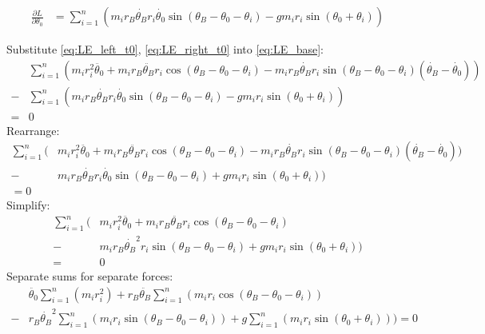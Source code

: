\documentclass[titlepage]{article}
\numberwithin{equation}{section}
\begin{document}
\begin{align}
\frac{\partial L}{\partial \theta_0} &=
    \sum_{i=1}^{n}(
        m_i r_B \dot{\theta_B} r_i \dot{\theta_0} \sin{(\theta_B - \theta_0 - \theta_i)}
      - g m_i r_i \sin{(\theta_0 + \theta_i)}
    ) \label{eq:LE_right_t0}
\end{align}

\bigskip
\noindent
Substitute \ref{eq:LE_left_t0}, \ref{eq:LE_right_t0} into \ref{eq:LE_base}:
\begin{align}
&\sum_{i=1}^{n}(
    m_i r_i^2 \ddot{\theta_0}
  + m_i r_B \ddot{\theta_B} r_i \cos{(\theta_B - \theta_0 - \theta_i)}
  - m_i r_B \dot{\theta_B} r_i \sin{(\theta_B - \theta_0 - \theta_i)} (\dot{\theta_B} - \dot{\theta_0})
) \nonumber \\
- &\sum_{i=1}^{n}(
    m_i r_B \dot{\theta_B} r_i \dot{\theta_0} \sin{(\theta_B - \theta_0 - \theta_i)}
  - g m_i r_i \sin{(\theta_0 + \theta_i)}
) \nonumber \\
= &0
\end{align}
Rearrange:
\begin{align}
\sum_{i=1}^{n}(
    &m_i r_i^2 \ddot{\theta_0}
  + m_i r_B \ddot{\theta_B} r_i \cos{(\theta_B - \theta_0 - \theta_i)}
  - m_i r_B \dot{\theta_B} r_i \sin{(\theta_B - \theta_0 - \theta_i)} (\dot{\theta_B} - \dot{\theta_0})) \nonumber \\
  - &m_i r_B \dot{\theta_B} r_i \dot{\theta_0} \sin{(\theta_B - \theta_0 - \theta_i)}
  + g m_i r_i \sin{(\theta_0 + \theta_i)}
) \nonumber \\
= 0
\end{align}
Simplify:
\begin{align}
\sum_{i=1}^{n}(
    &m_i r_i^2 \ddot{\theta_0} + m_i r_B \ddot{\theta_B} r_i \cos{(\theta_B - \theta_0 - \theta_i)} \nonumber \\
  - &m_i r_B \dot{\theta_B}^2 r_i \sin{(\theta_B - \theta_0 - \theta_i)}
  + g m_i r_i \sin{(\theta_0 + \theta_i)}
) \nonumber \\
= &0
\end{align}
Separate sums for separate forces:
\begin{align}
  &\ddot{\theta_0} \sum_{i=1}^{n}(m_i r_i^2)
+ r_B \ddot{\theta_B} \sum_{i=1}^{n}(m_i r_i \cos{(\theta_B - \theta_0 - \theta_i)}) \nonumber \\
- &r_B \dot{\theta_B}^2 \sum_{i=1}^{n}(m_i r_i \sin{(\theta_B - \theta_0 - \theta_i)})
+ g \sum_{i=1}^{n}(m_i r_i \sin{(\theta_0 + \theta_i)}))
= 0
\end{align}
\end{document}
